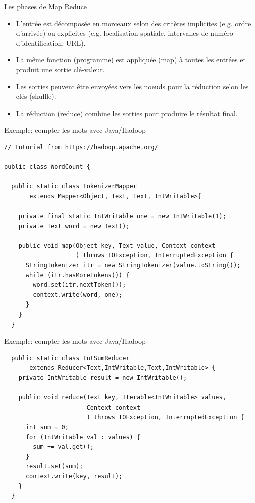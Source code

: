 \documentclass[10pt]{beamer}
\begin{document}
\begin{frame}{Les phases de Map Reduce}

  \begin{itemize}
    \item L'entrée est décomposée en morceaux selon des critères implicites (e.g. ordre d'arrivée) ou explicites (e.g. localisation spatiale, intervalles de numéro d'identification, URL).

    \item La même fonction (programme) est appliquée (map) à toutes les entrées et produit une sortie clé-valeur.

    \item Les sorties peuvent être envoyées vers les noeuds pour la réduction selon les clés (shuffle). 

    \item La réduction (reduce) combine les sorties pour produire le résultat final.
  \end{itemize}
\end{frame}

\begin{frame}[fragile]{Exemple: compter les mots avec Java/Hadoop}

  \scriptsize
  \begin{verbatim}
// Tutorial from https://hadoop.apache.org/

public class WordCount {

  public static class TokenizerMapper
       extends Mapper<Object, Text, Text, IntWritable>{

    private final static IntWritable one = new IntWritable(1);
    private Text word = new Text();

    public void map(Object key, Text value, Context context
                    ) throws IOException, InterruptedException {
      StringTokenizer itr = new StringTokenizer(value.toString());
      while (itr.hasMoreTokens()) {
        word.set(itr.nextToken());
        context.write(word, one);
      }
    }
  }
  \end{verbatim}
\end{frame}

\begin{frame}[fragile]{Exemple: compter les mots avec Java/Hadoop}

  \small
  \begin{verbatim}
  public static class IntSumReducer
       extends Reducer<Text,IntWritable,Text,IntWritable> {
    private IntWritable result = new IntWritable();

    public void reduce(Text key, Iterable<IntWritable> values,
                       Context context
                       ) throws IOException, InterruptedException {
      int sum = 0;
      for (IntWritable val : values) {
        sum += val.get();
      }
      result.set(sum);
      context.write(key, result);
    }
  }
  \end{verbatim}
\end{frame}
\end{document}
